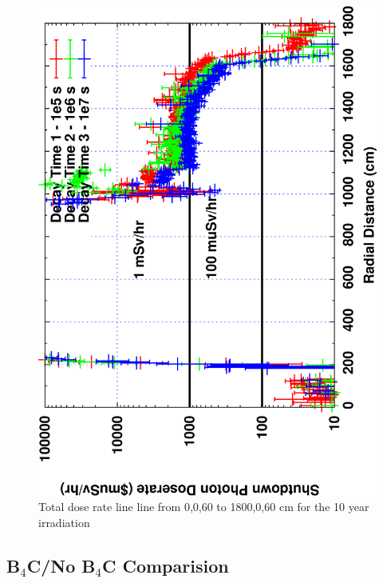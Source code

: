 \documentclass[12pt]{article}
\begin{document}
\begin{figure}[ht!]
\centering
\includegraphics[clip,scale=0.12,angle=-90]{../plots/photon_lineout/10yr/b4c_10yr.png}
\caption{Total dose rate line line from 0,0,60 to 1800,0,60 cm for the 10 year irradiation}
\label{fig:photons_10y_b4c_dose}
\end{figure}

\clearpage
\newpage
\subsection{B$_4$C/No B$_4$C Comparision}
\end{document}
